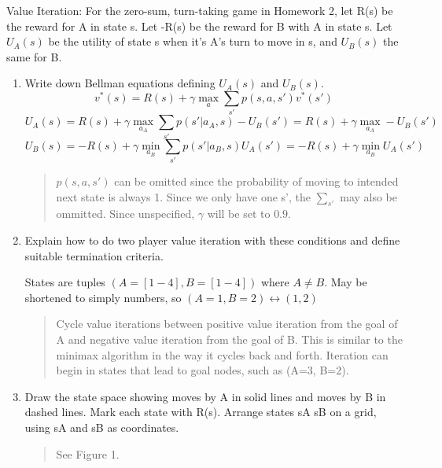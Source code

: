 \documentclass[11pt]{article}
\newenvironment{problem}[2][Problem]{\begin{trivlist}
\item[\hskip \labelsep {\bfseries #1}\hskip \labelsep {\bfseries #2.}]}{\end{trivlist}}
\begin{document}
\begin{problem}{2} Value Iteration: For the zero-sum, turn-taking game in Homework 2, let R(s) be the reward for A in state s. Let -R(s) be the reward for B with A in state s. Let $U_A (s)$ be the utility of state s when it's A's turn to move in s, and $U_B (s)$ the same for B.
\begin{enumerate}
	\item Write down Bellman equations defining $U_A (s)$ and $U_B (s)$.
		\begin{equation}
			v^{*} (s) = R(s) + \gamma \max_a \sum_{s'} p(s,a,s') v^{*} (s')
		\end{equation}
		\begin{equation}
			U_A (s) = R(s) + \gamma \max_{a_A} \sum_{s'} p(s'|a_A,s) -U_B (s') = R(s) + \gamma \max_{a_A} -U_B (s')
		\end{equation}
		\begin{equation}
			U_B (s) = -R(s)+ \gamma \min_{a_B} \sum_{s'} p(s'|a_B,s) U_A (s') = -R(s) + \gamma \min_{a_B} U_A (s')
		\end{equation}
		\begin{verse}
			$p(s,a,s')$ can be omitted since the probability of moving to intended next state is always 1. Since we only have one s', the $\sum_{s'}$ may also be ommitted. Since unspecified, $\gamma$ will be set to $0.9$.
		\end{verse}
	\item Explain how to do two player value iteration with these conditions and define suitable termination criteria.
		\begin{text}
			States are tuples $(A = [1-4], B = [1-4])$ where $ A \neq B$. May be shortened to simply numbers, so $(A = 1, B = 2) \leftrightarrow (1,2)$
		\end{text}
		\begin{verse}
			Cycle value iterations between positive value iteration from the goal of A and negative value iteration from the goal of B. This is similar to the minimax algorithm in the way it cycles back and forth. Iteration can begin in states that lead to goal nodes, such as (A=3, B=2).
		\end{verse}
	\item Draw the state space showing moves by A in solid lines and moves by B in dashed lines. Mark each state with R(s). Arrange states sA sB on a grid, using sA and sB as coordinates.
		\begin{verse}
			See Figure 1.
		\end{verse}
		\begin{figure}

\end{figure}
\end{enumerate}
\end{problem}
\end{document}
